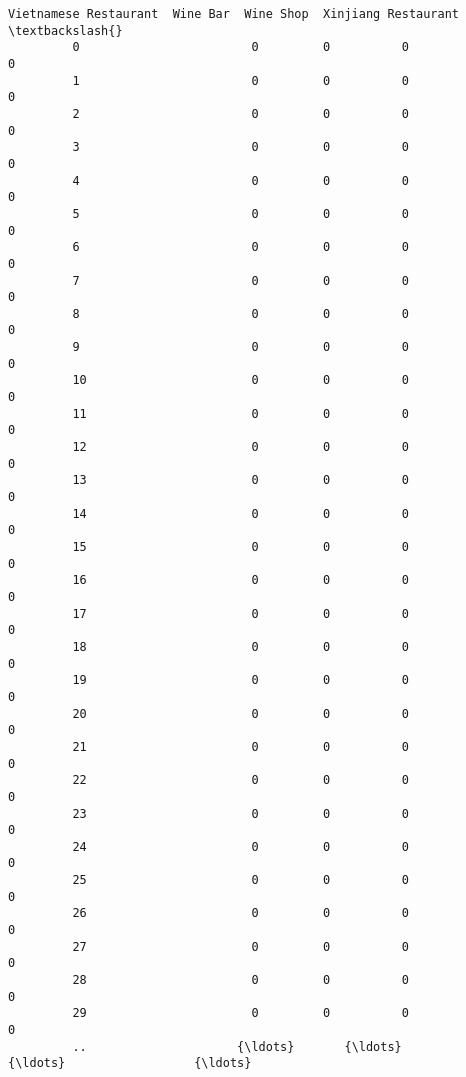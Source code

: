 \documentclass[11pt]{article}
\begin{document}
\begin{Verbatim}[commandchars=\\\{\}]
              Vietnamese Restaurant  Wine Bar  Wine Shop  Xinjiang Restaurant  \textbackslash{}
         0                        0         0          0                    0   
         1                        0         0          0                    0   
         2                        0         0          0                    0   
         3                        0         0          0                    0   
         4                        0         0          0                    0   
         5                        0         0          0                    0   
         6                        0         0          0                    0   
         7                        0         0          0                    0   
         8                        0         0          0                    0   
         9                        0         0          0                    0   
         10                       0         0          0                    0   
         11                       0         0          0                    0   
         12                       0         0          0                    0   
         13                       0         0          0                    0   
         14                       0         0          0                    0   
         15                       0         0          0                    0   
         16                       0         0          0                    0   
         17                       0         0          0                    0   
         18                       0         0          0                    0   
         19                       0         0          0                    0   
         20                       0         0          0                    0   
         21                       0         0          0                    0   
         22                       0         0          0                    0   
         23                       0         0          0                    0   
         24                       0         0          0                    0   
         25                       0         0          0                    0   
         26                       0         0          0                    0   
         27                       0         0          0                    0   
         28                       0         0          0                    0   
         29                       0         0          0                    0   
         ..                     {\ldots}       {\ldots}        {\ldots}                  {\ldots}   

\end{Verbatim}
\end{document}
